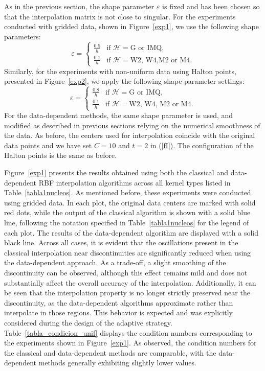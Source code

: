\documentclass[preprint]{elsarticle}       %
\begin{document}
As in the previous section, the shape parameter $\varepsilon$ is fixed and has been chosen so that the interpolation matrix is not close to singular. For the experiments conducted with gridded data, shown in Figure~\ref{exp1}, we use the following shape parameters:
\[
\varepsilon = 
\begin{cases}
\frac{0.5}{h} & \text{if } \mathcal{H} = \text{G or IMQ}, \\
\frac{0.1}{h} & \text{if } \mathcal{H} = \text{W2, W4,M2 or M4}.
\end{cases}
\]
Similarly, for the experiments with non-uniform data using Halton points, presented in Figure~\ref{exp2}, we apply the following shape parameter settings:
\[
\varepsilon = 
\begin{cases}
\frac{0.8}{h} & \text{if } \mathcal{H} = \text{G or IMQ}, \\
\frac{0.1}{h} & \text{if } \mathcal{H} = \text{W2, W4, M2 or M4}.
\end{cases}
\]
For the data-dependent methods, the same shape parameter is used, and modified as described in previous sections relying on the numerical smoothness of the data. As before, the centers used for interpolation coincide with the original data points and we have set $C=10$ and $t=2$ in (\ref{fI}). The configuration of the Halton points is the same as before.

Figure~\ref{exp1} presents the results obtained using both the classical and data-dependent RBF interpolation algorithms across all kernel types listed in Table~\ref{tabla1nucleos}. As mentioned before, these experiments were conducted using gridded data. In each plot, the original data centers are marked with solid red dots, while the output of the classical algorithm is shown with a solid blue line, following the notation specified in Table~\ref{tabla1nucleos} for the legend of each plot. The results of the data-dependent algorithm are displayed with a solid black line. Across all cases, it is evident that the oscillations present in the classical interpolation near discontinuities are significantly reduced when using the data-dependent approach. As a trade-off, a slight smoothing of the discontinuity can be observed, although this effect remains mild and does not substantially affect the overall accuracy of the interpolation. Additionally, it can be seen that the interpolation property is no longer strictly preserved near the discontinuity, as the data-dependent algorithms approximate rather than interpolate in those regions. This behavior is expected and was explicitly considered during the design of the adaptive strategy. Table~\ref{tabla_condicion_unif} displays the condition numbers corresponding to the experiments shown in Figure~\ref{exp1}. As observed, the condition numbers for the classical and data-dependent methods are comparable, with the data-dependent methods generally exhibiting slightly lower values.
\end{document}
